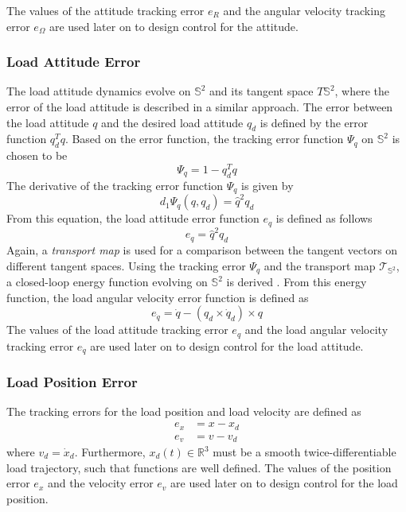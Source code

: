 The values of the  attitude tracking error $ e_R $ and the  angular velocity tracking error $ e_\Omega $ 
are used later on to design control for the  attitude.

\subsubsection*{Load Attitude Error}
The load attitude dynamics evolve on $ \mathbb{S}^2 $ and its tangent space $ T\mathbb{S}^2 $, where the error of the load attitude is described in a similar approach.
The error between the load attitude $ q $ and the desired load attitude $ q_d $ is defined by the error function $ q_d^Tq $. Based on the error function, the tracking error function $ \Psi_q $ on $ \mathbb{S}^2 $ is chosen to be
\begin{equation}\label{eq:psiq}
\Psi_q=1-q_d^Tq
\end{equation}
The derivative of the tracking error function $ \Psi_q $ is given by 
\begin{equation}\label{key}
d_1\Psi_q(q,q_d)=\hat{q}^2q_d
\end{equation}
From this equation, the load attitude error function $ e_q $ is defined as follows
\begin{equation}\label{eq:con.eq}
e_q=\hat{q}^2q_d
\end{equation}
Again, a \textit{transport map} is used for a comparison between the tangent vectors on different tangent spaces.
Using the tracking error $ \Psi_q $ and the transport map $ \mathcal{T}_{\mathbb{S}^2} $, a closed-loop energy function evolving on $ \mathbb{S}^2 $ is derived \cite[11.3.2]{Bullo2005}. From this energy function, the load angular velocity error function is defined as
\begin{equation}\label{eq:con.edq}
e_{\dot{q}}=\dot{q}-(q_d\times\dot{q}_d)\times q
\end{equation}
The values of the load attitude tracking error $ e_q $ and the load angular velocity tracking error $ e_{\dot{q}}$ 
are used later on to design control for the load attitude.

\subsubsection*{Load Position Error}
The tracking errors for the load position and load velocity are defined as
\begin{align}\label{key}
e_x&=x-x_d\\
e_v&=v-v_d
\end{align}
where $ v_d=\dot{x}_d $. Furthermore, $ x_d(t) \in \mathbb{R}^3$ must be a smooth twice-differentiable load trajectory, such that functions are well defined. The values of the position error $ e_x$ and the velocity error $ e_v $ are used later on to design control for the load position.

